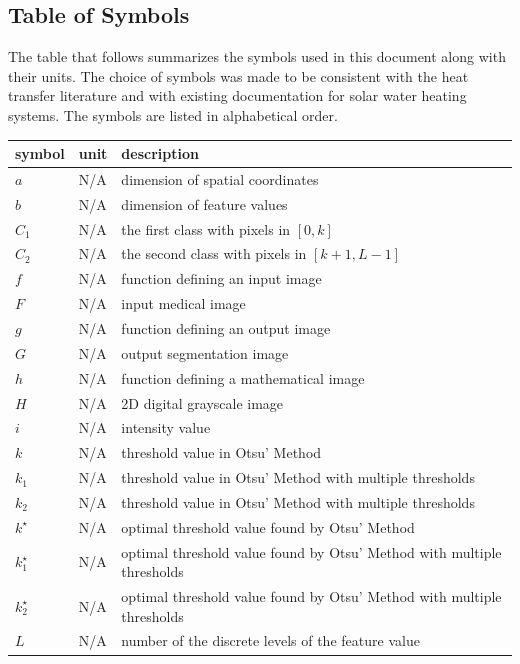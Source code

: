 \documentclass[12pt]{article}
\begin{document}
\subsection{Table of Symbols}

The table that follows summarizes the symbols used in this document along with
their units.  The choice of symbols was made to be consistent with the heat
transfer literature and with existing documentation for solar water heating
systems.  The symbols are listed in alphabetical order.

\renewcommand{\arraystretch}{1.2}
\noindent \begin{longtable*}{l l p{12cm}} \toprule
\textbf{symbol} & \textbf{unit} & \textbf{description}\\
\midrule 
$a$ & N/A & dimension of spatial coordinates
\\
$b$ & N/A & dimension of feature values
\\
$C_{1}$ & N/A & the first class with pixels in $[0, k]$
\\
$C_{2}$ & N/A & the second class with pixels in $[k+1, L-1]$
\\
$f$ & N/A & function defining an input image
\\
$F$ & N/A & input medical image
\\
$g$ & N/A & function defining an output image
\\
$G$ & N/A & output segmentation image
\\
$h$ & N/A & function defining a mathematical image
\\
$H$ & N/A & 2D digital grayscale image
\\
$i$ & N/A & intensity value
\\
$k$ & N/A & threshold value in Otsu' Method
\\
$k_{1}$ & N/A & threshold value in Otsu' Method with multiple thresholds
\\
$k_{2}$ & N/A & threshold value in Otsu' Method with multiple thresholds
\\
$k^{\star}$ & N/A & optimal  threshold  value found by Otsu' Method
\\
$k^{\star}_{1}$ & N/A & optimal threshold value found by Otsu' Method with
multiple thresholds
\\
$k^{\star}_{2}$ & N/A & optimal threshold value found by Otsu' Method with
multiple thresholds
\\
$L$ & N/A & number  of  the  discrete  levels  of  the  feature value

\end{longtable*}
\end{document}
